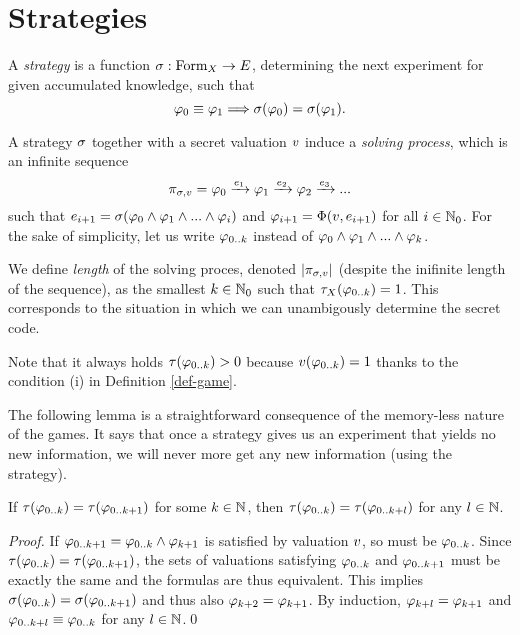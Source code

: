 \section{Strategies}

\begin{definition}
A \emph{strategy} is a function $\sigma: \textrm{Form}_X -> E$,
determining the next experiment for given accumulated knowledge,
such that
\[
\varphi_0 \equiv \varphi_1 ==> \sigma(\varphi_0) = \sigma(\varphi_1).
\]
\end{definition}

A strategy $\sigma$ together with a secret valuation $v$ induce
  a \emph{solving process}, which is an infinite sequence
\[
\pi_{\sigma,v} = \varphi_0 \xrightarrow{e_1} \varphi_1 \xrightarrow{e_2}
  \varphi_2 \xrightarrow{e_3} ...
\]
such that
$e_{i+1} = \sigma(\varphi_0 \wedge \varphi_1 \wedge ... \wedge \varphi_i)$ and
$\varphi_{i+1} = \Phi(v, e_{i+1})$ for all $i\in\mathbb{N}_0$.
For the sake of simplicity, let us write $\varphi_{0..k}$
instead of $\varphi_0 \wedge \varphi_1 \wedge ... \wedge \varphi_k$.

We define \emph{length} of the solving proces,
  denoted $|\pi_{\sigma,v}|$
  (despite the inifinite length of the sequence),
  as the smallest $k\in\mathbb{N}_0$ such that
  $\tau_X(\varphi_{0..k}) = 1$.
This corresponds to the situation in which we can unambigously
  determine the secret code.

Note that it always holds $\tau(\varphi_{0..k}) > 0$ because
  $v(\varphi_{0..k}) = 1$ thanks to the condition (i)
  in Definition \ref{def-game}.

The following lemma is a straightforward consequence
  of the memory-less nature of the games. It says that once a strategy
  gives us an experiment that yields no new information, we will never more get
  any new information (using the strategy).

\begin{lemma}
If $\tau(\varphi_{0..k}) = \tau(\varphi_{0..k+1})$ for some $k\in\mathbb{N}$,
then $\tau(\varphi_{0..k}) = \tau(\varphi_{0..k+l})$ for any $l\in\mathbb{N}$.
\end{lemma}

\begin{proof}
If $\varphi_{0..k+1} = \varphi_{0..k} \wedge \varphi_{k+1}$
is satisfied by valuation $v$, so must be $\varphi_{0..k}$.
Since $\tau(\varphi_{0..k}) = \tau(\varphi_{0..k+1})$, the sets of
valuations satisfying $\varphi_{0..k}$ and $\varphi_{0..k+1}$ must be exactly the same
and the formulas are thus equivalent. This implies
$\sigma(\varphi_{0..k}) = \sigma(\varphi_{0..k+1})$ and thus also $\varphi_{k+2} = \varphi_{k+1}$.
By induction, $\varphi_{k+l} = \varphi_{k+1}$ and $\varphi_{0..k+l} \equiv \varphi_{0..k}$
 for any $l\in\mathbb{N}$.\qed
\end{proof}

